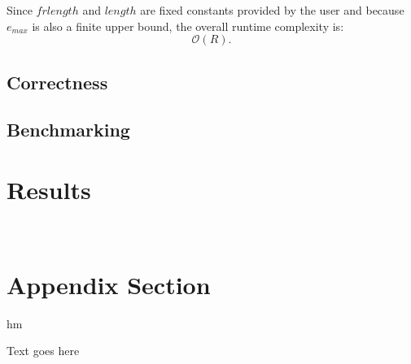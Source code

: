 \documentclass[12pt]{article}
\begin{document}
\begin{enumerate}
        Since $frlength$ and $length$ are fixed constants provided by the user and because $e_{max}$ is 
        also a finite upper bound, the overall runtime complexity is:
        \[
           \mathcal{O}(R) 
        .\]

\end{enumerate}
\subsection{Correctness}
\subsection{Benchmarking}

\section{Results}





\newpage~\appendix

\section{Appendix Section}

hm

Text goes here
\end{document}
